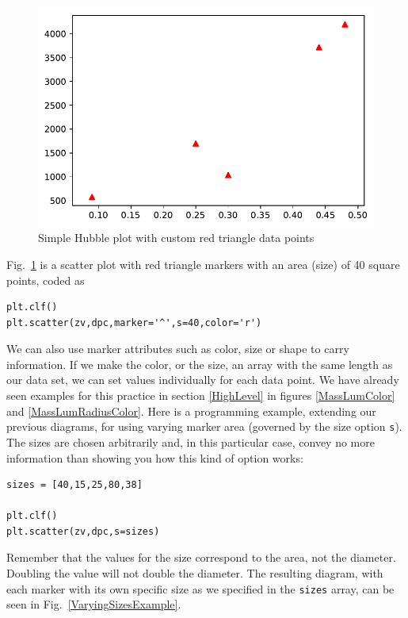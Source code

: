 \documentclass[twocolumn,apj]{openjournal}
\begin{document}
\begin{figure}[htbp]
\begin{center}
\includegraphics[width=\linewidth]{scatter-triangle.pdf}
\caption{Simple Hubble plot with custom red triangle data points}
\label{HubblePlot2}
\end{center}
\end{figure}
Fig.~\ref{HubblePlot2} is a scatter plot with red triangle markers with an area (size) of 40 square points, coded as
\begin{lstlisting}
plt.clf()
plt.scatter(zv,dpc,marker='^',s=40,color='r')
\end{lstlisting}
We can also use marker attributes such as color, size or shape to carry information. If we make the color, or the size, an array with the same length as our data set, we can set values individually for each data point. We have already seen examples for this practice in section \ref{HighLevel} in figures \ref{MassLumColor} and \ref{MassLumRadiusColor}. Here is a programming example, extending our previous diagrams, for using varying marker area (governed by the size option \verb|s|). The sizes are chosen arbitrarily and, in this particular case, convey no more information than showing you how this kind of option works:
\begin{lstlisting}
sizes = [40,15,25,80,38]

plt.clf()
plt.scatter(zv,dpc,s=sizes)
\end{lstlisting}
Remember that the values for the size correspond to the area, not the diameter. Doubling the value will not double the diameter. The resulting diagram, with each marker with its own specific size as we specified in the \verb|sizes| array, can be seen in Fig.~\ref{VaryingSizesExample}.
\end{document}
